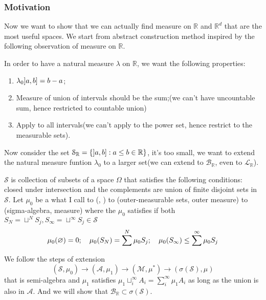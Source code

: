 \subsubsection{Motivation}
Now we want to show that we can actually find measure on \(\mathbb{R}\) and \(\mathbb{R}^{d}\) that are the most useful spaces. We start from abstract construction method inspired by the following observation of measure on \(\mathbb{R}\).

In order to have a natural measure \(\lambda\) on \(\mathbb{R}\), we want the following properties:
\begin{enumerate}
    \item \(\lambda_{0} \linterval{a}{b} = b - a \);
    \item Measure of union of intervals should be the sum;(we can't have uncountable sum, hence restricted to countable union)
    \item Apply to all intervals(we can't apply to the power set, hence restrict to the measurable sets).
\end{enumerate}

Now consider the set \(\mathcal{S}_{\mathbb{R}} = \Bqty{\linterval{a}{b} : a\leq b \in \mathbb{R}}\), it's too small, we want to extend the natural measure funtion \(\lambda_{0}\) to a larger set(we can extend to \(\mathcal{B}_{\mathbb{R}}\), even to \(\mathcal{L}_{\mathbb{R}}\)). 


 \(\mathcal{S}\) is collection of subsets of a space \(\Omega\) that satisfies the following conditions: closed under intersection and the complements are union of finite disjoint sets in \(\mathcal{S}\). Let \(\mu_{0}\) be a what I call  to ({, }) to (outer-measurable sets, outer measure) to ({sigma-algebra, measure}) where the  \(\mu_{0}\) satisfies if both \(S_{N} = \sqcup^{N}S_{j}, S_{\infty} = \sqcup^{\infty}S_{j} \in \mathcal{S}\)
\begin{equation*}
    \mu_{0}(\emptyset) = 0 ; \quad \mu_{0}\pqty{S_{N}} = \sum^{N} \mu_{0}S_{j}; \quad  \mu_{0}\pqty{S_{\infty}} \leq \sum^{\infty} \mu_{0}S_{j}
\end{equation*} 

We follow the steps of extension
\begin{equation*}
    (\mathcal{S}, \mu_{0}) \to (\mathcal{A}, \mu_{1}) \to (\mathcal{M}, \mu^{*}) \to (\sigma(\mathcal{S}), \mu)
\end{equation*}
that is semi-algebra and 
 \(\mu_{1}\) satisfies \(\mu_{1}\sqcup_{i}^{\infty} A_{i} = \sum_{i}^{\infty} \mu_{1} A_{i}\) as long as the union is also in \(\mathcal{A}\). And we will show that \(\mathcal{B}_{\mathbb{R}} \subset \sigma(\mathcal{S})\). 

